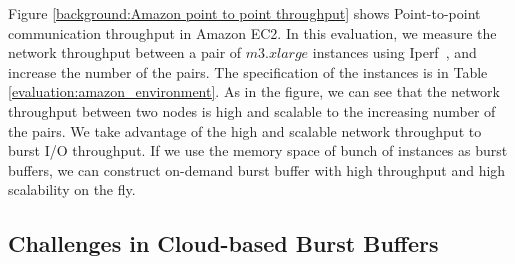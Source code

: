 Figure \ref{background:Amazon point to point throughput} shows Point-to-point
communication throughput in Amazon EC2. In this evaluation,
we measure the network throughput between a pair of $m3.xlarge$ instances using
Iperf~\cite{iperf}, and increase the number of the pairs. The specification of
the instances is in Table \ref{evaluation:amazon_environment}.
As in the figure, we can see that the network throughput between two nodes is
high and scalable to the increasing number of the pairs.
We take advantage of the high and scalable network throughput to burst I/O
throughput. If we use the memory space of bunch of instances as burst
buffers, we can construct on-demand burst buffer with high throughput
and high scalability on the fly.


\subsection{Challenges in Cloud-based Burst Buffers}

